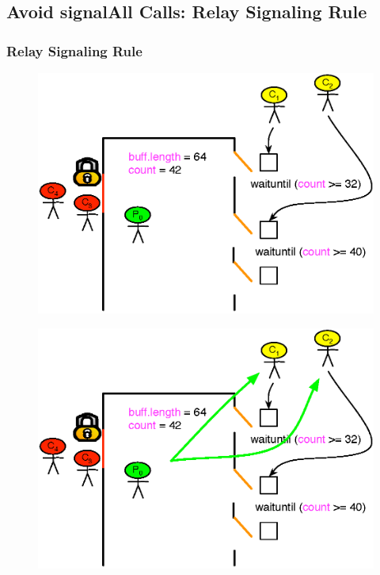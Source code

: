 \documentclass[mathserif,14pt,xcolor=table]{beamer}
\begin{document}
\subsection{Avoid signalAll Calls: Relay Signaling Rule}

\begin{frame}
    \frametitle{Relay Signaling Rule}
     {
        \begin{figure}[ht!]
            \centering
            \includegraphics[scale=0.75]{fig/sig_exp_1.eps}
        \end{figure}
    }
     {
        \begin{figure}[ht!]
            \centering
            \includegraphics[scale=0.75]{fig/sig_exp_2.eps}
        \end{figure}
    }

\end{frame}
\end{document}
